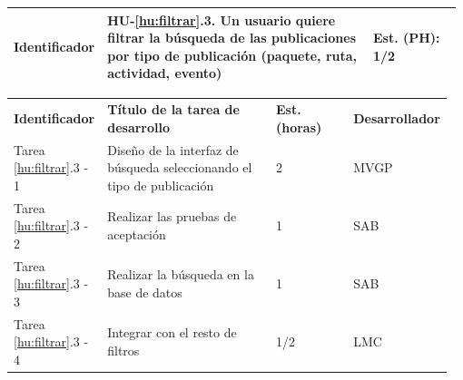\documentclass[11pt]{article}
\begin{document}
\begin{longtable}{p{0.18\linewidth}|p{0.6\linewidth}|p{0.2\linewidth}}
  \rowcolor{LightCyan}
  \textbf{Identificador} & \textbf{HU-\ref{hu:filtrar}.3}. Un usuario quiere filtrar la búsqueda de las publicaciones por tipo de publicación (paquete, ruta, actividad, evento) & \textbf{Est. (PH):} 1/2 \\
  \bottomrule
\end{longtable}
\vspace{-0.5cm}
\begin{longtable}{p{0.18\linewidth}|p{0.4\linewidth}|p{0.18\linewidth}|p{0.2\linewidth}}
  \toprule
  \textbf{Identificador} & \textbf{Título de la tarea de desarrollo} & \textbf{Est. (horas)} & \textbf{Desarrollador} \\
  Tarea \ref{hu:filtrar}.3 - 1 & Diseño de la interfaz de búsqueda seleccionando el tipo de publicación & 2 & MVGP\\
  Tarea \ref{hu:filtrar}.3 - 2 & Realizar las pruebas de aceptación & 1 & SAB\\
  Tarea \ref{hu:filtrar}.3 - 3 & Realizar la búsqueda en la base de datos & 1 & SAB \\
  Tarea \ref{hu:filtrar}.3 - 4 & Integrar con el resto de filtros & 1/2 & LMC\\
  \bottomrule
\end{longtable}
\end{document}
